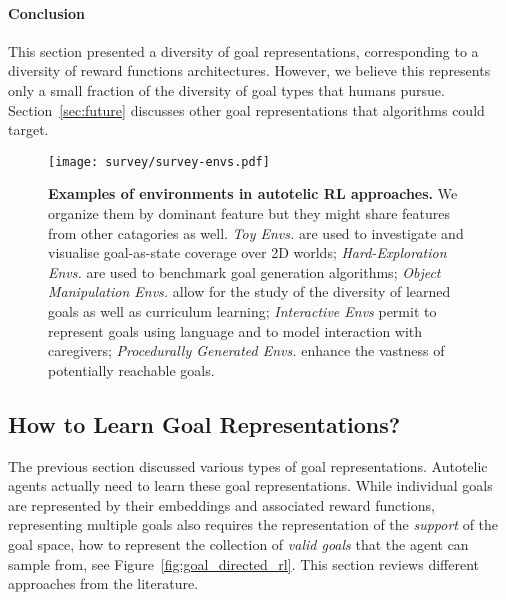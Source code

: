 \paragraph{Conclusion}
This section presented a diversity of goal representations, corresponding to a diversity of reward functions architectures. However, we believe this represents only a small fraction of the diversity of goal types that humans pursue. Section~\ref{sec:future} discusses other goal representations that \rl algorithms could target.

\begin{figure}[h]
    \centering
    \texttt{[image: survey/survey-envs.pdf]}
    \caption{\textbf{Examples of environments in autotelic RL approaches.} We organize them by dominant feature but they might share features from other catagories as well. \textit{Toy Envs.} are used to investigate and visualise goal-as-state coverage over 2D worlds; \textit{Hard-Exploration Envs.} are used to benchmark goal generation algorithms; \textit{Object Manipulation Envs.} allow for the study of the diversity of learned goals as well as curriculum learning; \textit{Interactive Envs} permit to represent goals using language and to model interaction with caregivers; \textit{Procedurally Generated Envs.} enhance the vastness of potentially reachable goals.}
    \label{fig:envs}
\end{figure}

\subsection{How to Learn Goal Representations?}
\label{sec:survey_learning_goal_rep}

The previous section discussed various types of goal representations. Autotelic agents actually need to learn these goal representations. While individual goals are represented by their embeddings and associated reward functions, representing multiple goals also requires the representation of the \textit{support} of the goal space, \ie how to represent the collection of \textit{valid goals} that the agent can sample from, see Figure~\ref{fig:goal_directed_rl}. This section reviews different approaches from the literature.

